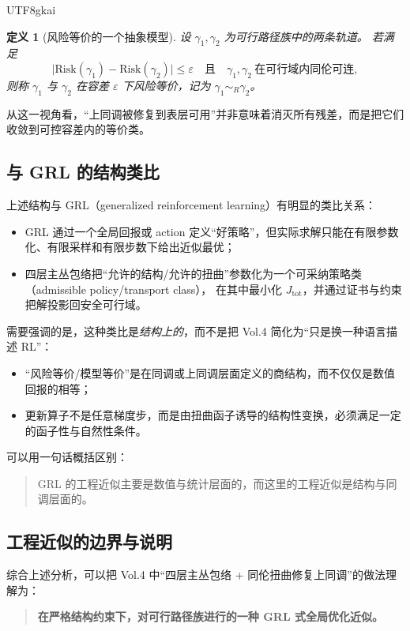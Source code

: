 \documentclass[12pt]{article}
\newtheorem{definition}{定义}[section]
\begin{document}
\begin{CJK*}{UTF8}{gkai}
\begin{definition}[风险等价的一个抽象模型]
设 $\gamma_1,\gamma_2$ 为可行路径族中的两条轨道。
若满足
\[
  \bigl|\mathrm{Risk}(\gamma_1)-\mathrm{Risk}(\gamma_2)\bigr|\le\varepsilon
  \quad\text{且}\quad
  \gamma_1,\gamma_2\ \text{在可行域内同伦可连},
\]
则称 $\gamma_1$ 与 $\gamma_2$ 在容差 $\varepsilon$ 下\emph{风险等价}，记为 $\gamma_1\sim_R\gamma_2$。
\end{definition}

从这一视角看，“上同调被修复到表层可用”并非意味着消灭所有残差，而是把它们收敛到可控容差内的等价类。

\subsection{与 GRL 的结构类比}

上述结构与 GRL（generalized reinforcement learning）有明显的类比关系：
\begin{itemize}
  \item GRL 通过一个全局回报或 action 定义“好策略”，但实际求解只能在有限参数化、有限采样和有限步数下给出近似最优；
  \item 四层主丛包络把“允许的结构/允许的扭曲”参数化为一个可采纳策略类（admissible policy/transport class），
        在其中最小化 $J_{\text{tot}}$，并通过证书与约束把解投影回安全可行域。
\end{itemize}

需要强调的是，这种类比是\emph{结构上的}，而不是把 Vol.4 简化为“只是换一种语言描述 RL”：
\begin{itemize}
  \item “风险等价/模型等价”是在同调或上同调层面定义的商结构，而不仅仅是数值回报的相等；
  \item 更新算子不是任意梯度步，而是由扭曲函子诱导的结构性变换，必须满足一定的函子性与自然性条件。
\end{itemize}

可以用一句话概括区别：
\begin{quote}
GRL 的工程近似主要是数值与统计层面的，而这里的工程近似是结构与同调层面的。
\end{quote}

\subsection{工程近似的边界与说明}

综合上述分析，可以把 Vol.4 中“四层主丛包络 + 同伦扭曲修复上同调”的做法理解为：
\begin{quote}
\textbf{在严格结构约束下，对可行路径族进行的一种 GRL 式全局优化近似。}
\end{quote}


\end{CJK*}
\end{document}
